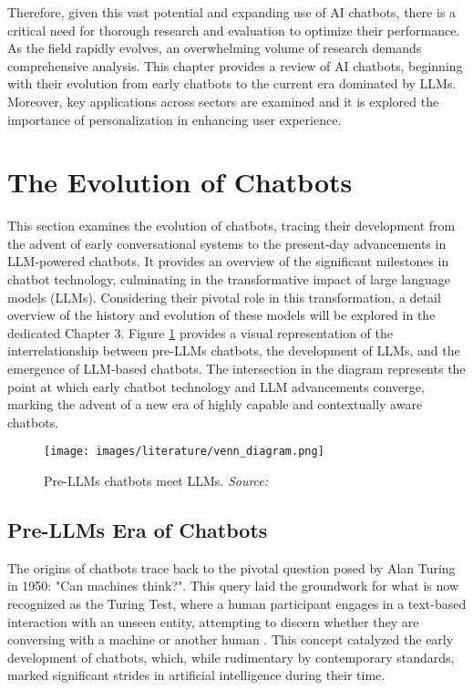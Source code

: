 Therefore, given this vast potential and expanding use of AI chatbots, there is a critical need for thorough research and evaluation to optimize their performance. As the field rapidly evolves, an overwhelming volume of research demands comprehensive analysis. This chapter provides a review of AI chatbots, beginning with their evolution from early chatbots to the current era dominated by LLMs. Moreover, key applications across sectors are examined and it is explored the importance of personalization in enhancing user experience.

\section{The Evolution of Chatbots}

This section examines the evolution of chatbots, tracing their development from the advent of early conversational systems to the present-day advancements in LLM-powered chatbots. It provides an overview of the significant milestones in chatbot technology, culminating in the transformative impact of large language models (LLMs). Considering their pivotal role in this transformation, a detail overview of the history and evolution of these models will be explored in the dedicated Chapter 3. Figure \ref{fig:chatbot_venn_diagram} provides a visual representation of the interrelationship between pre-LLMs chatbots, the development of LLMs, and the emergence of LLM-based chatbots. The intersection in the diagram represents the point at which early chatbot technology and LLM advancements converge, marking the advent of a new era of highly capable and contextually aware chatbots.

\begin{figure}[h!]
    \centering
    \texttt{[image: images/literature/venn\_diagram.png]}
    \caption{Pre-LLMs chatbots meet LLMs. \textit{Source:} \cite{dam2024complete}}
    \label{fig:chatbot_venn_diagram}
\end{figure}

\subsection{Pre-LLMs Era of Chatbots}

The origins of chatbots trace back to the pivotal question posed by Alan Turing in 1950: "Can machines think?". This query laid the groundwork for what is now recognized as the Turing Test, where a human participant engages in a text-based interaction with an unseen entity, attempting to discern whether they are conversing with a machine or another human \cite{turing2009computing}. This concept catalyzed the early development of chatbots, which, while rudimentary by contemporary standards, marked significant strides in artificial intelligence during their time.

